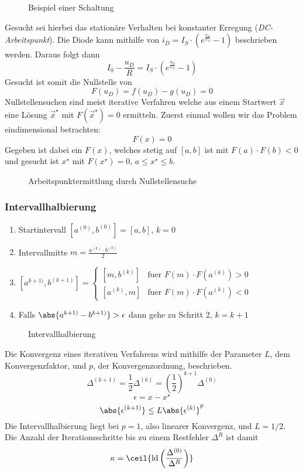 \begin{figure}[htdp]
	\center
	
	\caption{Beispiel einer Schaltung}
\end{figure}

Gesucht sei hierbei das stationäre Verhalten bei konstanter Erregung (\emph{DC-Arbeitspunkt}). Die Diode kann mithilfe von $i_D = I_S \cdot \left(e^{\frac{u_D}{U_T}} - 1\right)$ beschrieben werden. Daraus folgt dann
\[I_0 - \frac{u_D}{R} = I_S \cdot \left(e^{\frac{u_D}{U_T}} - 1\right)\]
Gesucht ist somit die Nullstelle von
\[F(u_D) = f(u_D) - g(u_D) = 0\]
Nullstellensuchen sind meist iterative Verfahren welche aus einem Startwert $\vec{x}$ eine Lösung $\vec{x}^\star$ mit $F(\vec{x}^\star) = 0$ ermitteln. Zuerst einmal wollen wir das Problem eindimensional betrachten:
\[F(x) = 0\]
Gegeben ist dabei ein $F(x)$, welches stetig auf $[a, b]$ ist mit $F(a) \cdot F(b) < 0$ und gesucht ist $x^\star$ mit $F(x^\star) = 0$, $a \le x^\star \le b$.

\begin{figure}[htdp]
	\center
	
	\caption{Arbeitspunktermittlung durch Nullstellensuche}
\end{figure}

\subsubsection{Intervallhalbierung}
\begin{enumerate}
	\item Startintervall $[a^{(0)}, b^{(0)}] = [a, b]$, $k = 0$
	\item Intervallmitte $m = \frac{a^{(k)} \cdot b^{(k)}}{2}$
	\item $[a^{k + 1)}, b^{(k + 1)}] = \begin{cases} [m, b^{(k)}] & \text{fuer\ } F(m) \cdot F(a^{(k)}) > 0 \\ [a^{(k)}, m] & \text{fuer\ } F(m) \cdot F(a^{(k)}) < 0 \end{cases}$
	\item Falls $\abs{a^{k + 1)} - b^{k + 1)}} > \epsilon$ dann gehe zu Schritt 2, $k = k + 1$
\end{enumerate}

\begin{figure}[htdp]
	\center
	
	\caption{Intervallhalbierung}
\end{figure}

Die Konvergenz eines iterativen Verfahrens wird mithilfe der Parameter $L$, dem Konvergenzfaktor, und $p$, der Konvergenzordnung, beschrieben.
\[\Delta^{(k + 1)} = \frac{1}{2} \Delta^{(k)} = (\frac{1}{2})^{k + 1} \Delta^{(0)}\]
\[\epsilon = x - x^\star\]
\[\abs{\epsilon^{(k + 1)}} \le L \abs{\epsilon^{(k)}}^p\]
Die Intervallhalbierung liegt bei $p = 1$, also linearer Konvergenz, und $L = 1/2$. Die Anzahl der Iterationsschritte bis zu einem Restfehler $\Delta^R$ ist damit
\[\kappa = \ceil{\ld \left( \frac{\Delta^{(0)}}{\Delta^R}\right)}\]

